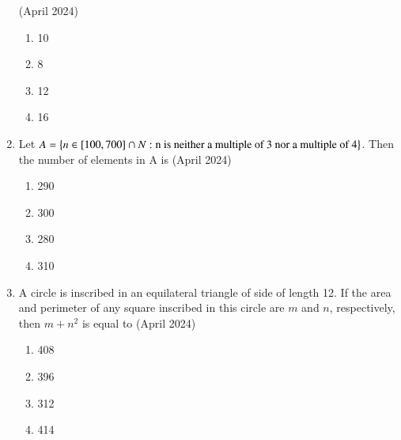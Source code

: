 \documentclass[journal,12pt,onecolumn]{IEEEtran}
\theoremstyle{remark}
\begin{document}
\begin{enumerate}
\hfill{(April 2024)} 
\begin{enumerate}
        \item 10
        \item 8
        \item 12
        \item 16
    \end{enumerate}
    \item Let $A=\left\{n \in [100,700]\cap N :\text{n is neither a multiple of 3 nor a multiple of 4}\right\}$. Then the number of elements in A is 
\hfill{(April 2024)} 
\begin{enumerate}
        \item 290
        \item 300
        \item 280
        \item 310
    \end{enumerate}

    \item A circle is inscribed in an equilateral triangle of side of length 12. If the area and perimeter of any square inscribed in this circle are $m$ and $n$, respectively, then $m+n^2$ is equal to 
\hfill{(April 2024)} 
\begin{enumerate}
        \item 408
        \item 396
        \item 312
        \item 414
    \end{enumerate}
    
    \end{enumerate}
\end{document}
